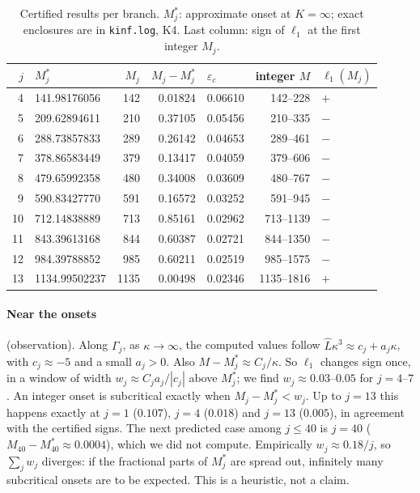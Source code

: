 \documentclass[11pt,a4paper]{report}
\begin{document}
\begin{table}[h]
\centering\small
\caption{Certified results per branch. \(M^*_j\): approximate onset at \(K=\infty\); exact enclosures are in \texttt{kinf.log}, K4. Last column: sign of
\(\ell_1\) at the first integer \(M_j\).}\label{tab:results}
\begin{tabular}{@{}rlrrlrl@{}}
\toprule
\(j\) & \(M^*_j\) & \(M_j\) & \(M_j-M^*_j\) & \(\varepsilon_c\) & integer \(M\) & \(\ell_1(M_j)\)\\
\midrule
4 & 141.98176056 & 142 & 0.01824 & 0.06610 & 142--228 & \(+\)\\
5 & 209.62894611 & 210 & 0.37105 & 0.05456 & 210--335 & \(-\)\\
6 & 288.73857833 & 289 & 0.26142 & 0.04653 & 289--461 & \(-\)\\
7 & 378.86583449 & 379 & 0.13417 & 0.04059 & 379--606 & \(-\)\\
8 & 479.65992358 & 480 & 0.34008 & 0.03609 & 480--767 & \(-\)\\
9 & 590.83427770 & 591 & 0.16572 & 0.03252 & 591--945 & \(-\)\\
10 & 712.14838889 & 713 & 0.85161 & 0.02962 & 713--1139 & \(-\)\\
11 & 843.39613168 & 844 & 0.60387 & 0.02721 & 844--1350 & \(-\)\\
12 & 984.39788852 & 985 & 0.60211 & 0.02519 & 985--1575 & \(-\)\\
13 & 1134.99502237 & 1135 & 0.00498 & 0.02346 & 1135--1816 & \(+\)\\
\bottomrule
\end{tabular}
\end{table}

\paragraph{Near the onsets} (observation). Along \(\Gamma_j\), as \(\kappa\to\infty\), the computed values follow
\(\widehat L\kappa^3\approx c_j+a_j\kappa\), with \(c_j\approx-5\) and a small \(a_j>0\). Also
\(M-M^*_j\approx C_j/\kappa\). So \(\ell_1\) changes sign once, in a window of width \(w_j\approx C_ja_j/|c_j|\) above
\(M^*_j\); we find \(w_j\approx0.03\)--\(0.05\) for \(j=4\)--\(7\). An integer onset is subcritical exactly when
\(M_j-M^*_j<w_j\). Up to \(j=13\) this happens exactly at \(j=1\) (\(0.107\)), \(j=4\) (\(0.018\)) and \(j=13\) (\(0.005\)),
in agreement with the certified signs. The next predicted case among \(j\le40\) is \(j=40\)
(\(M_{40}-M^*_{40}\approx0.0004\)), which we did not compute. Empirically \(w_j\approx0.18/j\), so \(\sum_jw_j\) diverges:
if the fractional parts of \(M^*_j\) are spread out, infinitely many subcritical onsets are to be expected. This is a
heuristic, not a claim.
\end{document}
